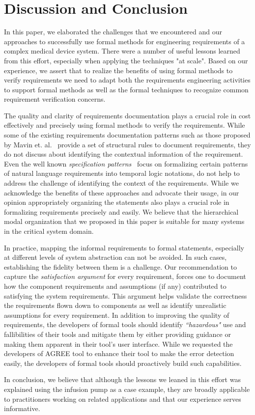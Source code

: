 \section{Discussion and Conclusion}
\label{sec:conclusion}

In this paper, we elaborated the challenges that we encountered and our approaches to successfully use formal methods for engineering requirements of a complex medical device system. There were a number of useful lessons learned from this effort, especially when applying the techniques "at scale". Based on our experience, we assert that to realize the benefits of using formal methods to verify requirements we need to adapt both the requirements engineering activities to support formal methods as well as the formal techniques to recognize common requirement verification concerns.

The quality and clarity of requirements documentation plays a crucial role in cost effectively and precisely using formal methods to verify the requirements. While some of the existing requirements documentation patterns such as those proposed by Mavin et. al.~\cite{mavin2009easy} provide a set of structural rules to document requirements, they do not discuss about identifying the contextual information of the requirement. Even the well known \emph{specification patterns}~\cite{dwyer1999patterns} focus on formalizing certain patterns of natural language requirements into temporal logic notations, do not help to address the challenge of identifying the context of the requirements. While we acknowledge the benefits of these approaches and advocate their usage, in our opinion appropriately organizing the statements also plays a crucial role in formalizing requirements precisely and easily. We believe that the hierarchical modal organization that we proposed in this paper is suitable for many systems in the critical system domain. 

In practice, mapping the informal requirements to formal statements, especially at different levels of system abstraction can not be avoided. In such cases, establishing the fidelity between them is a challenge. Our recommendation to capture the \emph{satisfaction argument} for every requirement, forces one to document how the component requirements and assumptions (if any)  contributed to satisfying the system requirements. This argument helps validate the correctness the requirements flown down to components as well as identify unrealistic assumptions for every requirement. 
In addition to improving the quality of requirements, the developers of formal tools should identify \emph{``hazardous"} use and fallibilities of their tools and mitigate them by either providing guidance or making them apparent in their tool's user interface. While we requested the developers of AGREE tool to enhance their tool to make the error detection easily, the developers of formal tools should proactively build such capabilities.

In conclusion, we believe that although the lessons we leaned in this effort was explained using the infusion pump as a case example, they are broadly applicable to practitioners working on related applications and that our experience serves informative.







